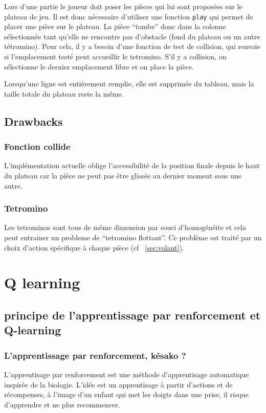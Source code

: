 \documentclass{report}
\begin{document}
Lors d'une partie le joueur doit poser les pièces qui lui sont proposées sur
le plateau de jeu. Il est donc nécessaire d'utiliser une fonction \texttt{play}
qui permet de placer une pièce sur le plateau. La pièce ``tombe'' donc dans la
colonne sélectionnée tant qu'elle ne rencontre pas d'obstacle (fond du plateau
ou un autre tétromino). Pour cela, il y a besoin d'une fonction de test de
collision, qui renvoie si l'emplacement testé peut accueillir le tetromino.
S'il y a collision, on sélectionne le dernier emplacement libre et on place la
pièce.

Lorsqu'une ligne est entièrement remplie, elle est supprimée du tableau, mais
la taille totale du plateau reste la même.

\section{Drawbacks}
\subsection{Fonction collide}
L'implémentation actuelle oblige l'accessibilité de la position finale depuis
le haut du plateau car la pièce ne peut pas être glissée au dernier moment
sous une autre.
\subsection{Tetromino}
Les tetrominos sont tous de même dimension par souci d'homogénéite et cela
peut entrainer un probleme de ``tetromino flottant''. Ce problème est traité par
un choix d'action spécifique à chaque pièce (cf ~\ref{sec:volant}).


\chapter{Q learning}

\section{principe de l'apprentissage par renforcement et Q-learning}
\subsection{L'apprentissage par renforcement, késako ?}

L'apprentisage par renforcement est une méthode d'apprentisage automatique
inspirée de la biologie. L'idée est un apprentisage à partir d'actions et
de récompenses, à l'image d'un enfant qui met les doigts dans une prise, il
risque d'apprendre et ne plus recommencer.
\end{document}

